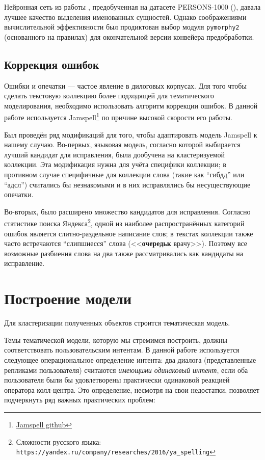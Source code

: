 Нейронная сеть из работы \cite{burtsev}, предобученная на датасете PERSONS-1000 (\cite{persona}), давала лучшее качество выделения именованных сущностей. Однако соображениями вычислительной эффективности был продиктован выбор модуля \texttt{pymorphy2} (основанного на правилах) для окончательной версии конвейера предобработки.

\subsection{Коррекция ошибок}

\par Ошибки и опечатки --- частое явление в дилоговых корпусах. Для того чтобы сделать текстовую коллекцию более подходящей для тематического моделирования, необходимо использовать алгоритм коррекции ошибок. В данной работе используется Jamspell\footnote{\href{https://github.com/bakwc/JamSpell}{Jamspell github}} по причине высокой скорости его работы.

\par Был проведён ряд модификаций для того, чтобы адаптировать модель Jamspell к нашему случаю. Во-первых, языковая модель, согласно которой выбирается лучший кандидат для исправления, была дообучена на кластеризуемой коллекции. Эта модификация нужна для учёта специфики коллекции; в противном случае специфичные для коллекции слова (такие как ``гибдд'' или ``адсл'') считались бы незнакомыми и в них исправлялись бы несуществующие опечатки.

Во-вторых, было расширено множество кандидатов для исправления. Согласно статистике поиска Яндекса\footnote{Сложности русского языка: \texttt{https://yandex.ru/company/researches/2016/ya\_spelling}}, одной из наиболее распространённых категорий ошибок является слитно-раздельное написание слов; в текстах коллекции также часто встречаются ``слипшиесся'' слова (<<\textbf{очередьк} врачу>>). Поэтому все возможные разбиения слова на два также рассматривались как кандидаты на исправление.

\section{Построение модели}
Для кластеризации полученных объектов строится тематическая модель. \par Темы тематической модели, которую мы стремимся построить, должны соответствовать пользовательским интентам. В данной работе используется следующее операциональное определение интента: два диалога (представленные репликами пользователя) считаются \textit{имеющими одинаковый интент}, если оба пользователя были бы удовлетворены практически одинаковой реакцией оператора колл-центра. Это определение, несмотря на свои недостатки, позволяет подчеркнуть ряд важных практических проблем:

